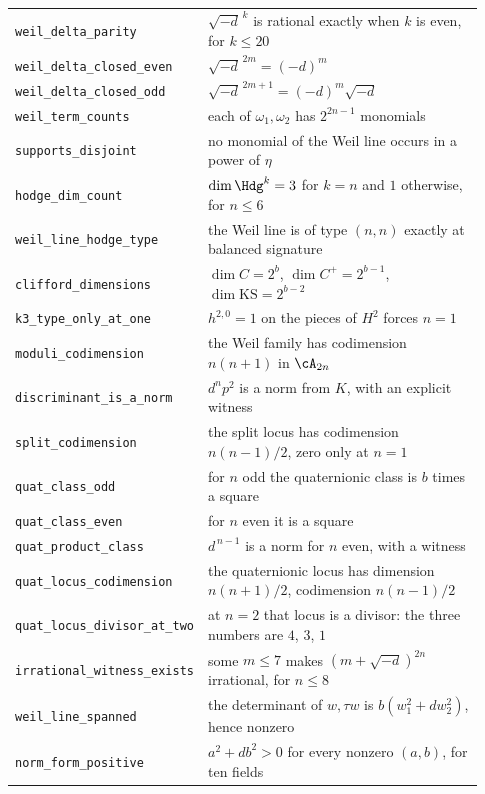 \begin{longtable}{@{}>{\raggedright\arraybackslash}p{0.31\linewidth}>{\raggedright\arraybackslash}p{0.62\linewidth}@{}}
\texttt{weil\_delta\_parity} & $\sqrt{-d}^{\,k}$ is rational exactly when $k$ is even, for $k\le20$ \\
\texttt{weil\_delta\_closed\_even} & $\sqrt{-d}^{\,2m}=(-d)^{m}$ \\
\texttt{weil\_delta\_closed\_odd} & $\sqrt{-d}^{\,2m+1}=(-d)^{m}\sqrt{-d}$ \\
\texttt{weil\_term\_counts} & each of $\omega_{1},\omega_{2}$ has $2^{2n-1}$ monomials \\
\texttt{supports\_disjoint} & no monomial of the Weil line occurs in a power of $\eta$ \\
\texttt{hodge\_dim\_count} & $\dim\Hdg^{k}=3$ for $k=n$ and $1$ otherwise, for $n\le6$ \\
\texttt{weil\_line\_hodge\_type} & the Weil line is of type $(n,n)$ exactly at balanced signature \\
\texttt{clifford\_dimensions} & $\dim C=2^{b}$, $\dim C^{+}=2^{b-1}$, $\dim\mathrm{KS}=2^{b-2}$ \\
\texttt{k3\_type\_only\_at\_one} & $h^{2,0}=1$ on the pieces of $H^{2}$ forces $n=1$ \\
\texttt{moduli\_codimension} & the Weil family has codimension $n(n+1)$ in $\cA_{2n}$ \\
\texttt{discriminant\_is\_a\_norm} & $d^{n}p^{2}$ is a norm from $K$, with an explicit witness \\
\texttt{split\_codimension} & the split locus has codimension $n(n-1)/2$, zero only at $n=1$ \\
\texttt{quat\_class\_odd} & for $n$ odd the quaternionic class is $b$ times a square \\
\texttt{quat\_class\_even} & for $n$ even it is a square \\
\texttt{quat\_product\_class} & $d^{\,n-1}$ is a norm for $n$ even, with a witness \\
\texttt{quat\_locus\_codimension} & the quaternionic locus has dimension $n(n+1)/2$, codimension $n(n-1)/2$ \\
\texttt{quat\_locus\_}\allowbreak\texttt{divisor\_at\_two} & at $n=2$ that locus is a divisor: the three numbers are $4$, $3$, $1$ \\
\texttt{irrational\_}\allowbreak\texttt{witness\_exists} & some $m\le7$ makes $(m+\sqrt{-d})^{2n}$ irrational, for $n\le8$ \\
\texttt{weil\_line\_spanned} & the determinant of $w,\tau w$ is $b(w_{1}^{2}+dw_{2}^{2})$, hence nonzero \\
\texttt{norm\_form\_positive} & $a^{2}+db^{2}>0$ for every nonzero $(a,b)$, for ten fields \\

\end{longtable}
